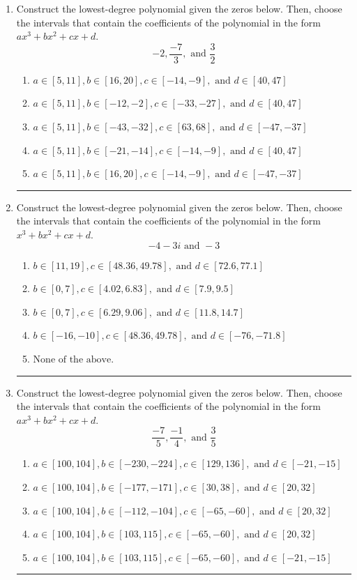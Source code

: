 \documentclass[14pt]{extbook}
\newcommand{\litem}[1]{\item#1\hspace*{-1cm}\rule{\textwidth}{0.4pt}}
\begin{document}
\begin{enumerate}
{\begin{enumerate}[label=\Alph*.]
\end{enumerate} }
\litem{
Construct the lowest-degree polynomial given the zeros below. Then, choose the intervals that contain the coefficients of the polynomial in the form $ax^3+bx^2+cx+d$.\[ -2, \frac{-7}{3}, \text{ and } \frac{3}{2} \]\begin{enumerate}[label=\Alph*.]
\item \( a \in [5, 11], b \in [16, 20], c \in [-14, -9], \text{ and } d \in [40, 47] \)
\item \( a \in [5, 11], b \in [-12, -2], c \in [-33, -27], \text{ and } d \in [40, 47] \)
\item \( a \in [5, 11], b \in [-43, -32], c \in [63, 68], \text{ and } d \in [-47, -37] \)
\item \( a \in [5, 11], b \in [-21, -14], c \in [-14, -9], \text{ and } d \in [40, 47] \)
\item \( a \in [5, 11], b \in [16, 20], c \in [-14, -9], \text{ and } d \in [-47, -37] \)

\end{enumerate} }
\litem{
Construct the lowest-degree polynomial given the zeros below. Then, choose the intervals that contain the coefficients of the polynomial in the form $x^3+bx^2+cx+d$.\[ -4 - 3 i \text{ and } -3 \]\begin{enumerate}[label=\Alph*.]
\item \( b \in [11, 19], c \in [48.36, 49.78], \text{ and } d \in [72.6, 77.1] \)
\item \( b \in [0, 7], c \in [4.02, 6.83], \text{ and } d \in [7.9, 9.5] \)
\item \( b \in [0, 7], c \in [6.29, 9.06], \text{ and } d \in [11.8, 14.7] \)
\item \( b \in [-16, -10], c \in [48.36, 49.78], \text{ and } d \in [-76, -71.8] \)
\item \( \text{None of the above.} \)

\end{enumerate} }
\litem{
Construct the lowest-degree polynomial given the zeros below. Then, choose the intervals that contain the coefficients of the polynomial in the form $ax^3+bx^2+cx+d$.\[ \frac{-7}{5}, \frac{-1}{4}, \text{ and } \frac{3}{5} \]\begin{enumerate}[label=\Alph*.]
\item \( a \in [100, 104], b \in [-230, -224], c \in [129, 136], \text{ and } d \in [-21, -15] \)
\item \( a \in [100, 104], b \in [-177, -171], c \in [30, 38], \text{ and } d \in [20, 32] \)
\item \( a \in [100, 104], b \in [-112, -104], c \in [-65, -60], \text{ and } d \in [20, 32] \)
\item \( a \in [100, 104], b \in [103, 115], c \in [-65, -60], \text{ and } d \in [20, 32] \)
\item \( a \in [100, 104], b \in [103, 115], c \in [-65, -60], \text{ and } d \in [-21, -15] \)


\end{enumerate}}
\end{enumerate}
\end{document}
